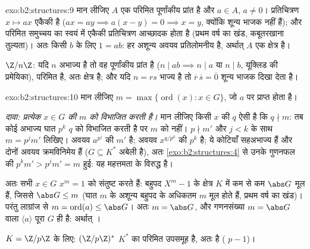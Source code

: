\begin{solution}{exo:b2:structures:9}
मान लीजिए $A$ एक परिमित पूर्णांकीय प्रांत है और $a \in A$, $a \neq 0$। प्रतिचित्रण
$x \mapsto ax$ एकैकी है ($ax = ay \implies a(x - y) = 0
\implies x = y$, क्योंकि शून्य भाजक नहीं हैं); और परिमित समुच्चय का
स्वयं में एकैकी प्रतिचित्रण आच्छादक होता है (प्रथम वर्ष का खंड,
कबूतरखाना तुल्यता)। अतः किसी $b$ के लिए $1 = ab$: हर अशून्य अवयव
प्रतिलोमनीय है, अर्थात् $A$ एक क्षेत्र है।

$\Z/n\Z$: यदि $n$ अभाज्य है तो वह पूर्णांकीय प्रांत है ($n \mid ab
\implies n \mid a$ या $n \mid b$,
यूक्लिड की प्रमेयिका), परिमित है, अतः क्षेत्र है; और यदि $n = rs$ भाज्य है
तो $\overline r\,\overline s =
\overline 0$ शून्य भाजक दिखा देता है।
\end{solution}

\begin{solution}{exo:b2:structures:10}
मान लीजिए $m = \max\{\operatorname{ord}(x) : x \in G\}$, जो $a$ पर प्राप्त होता है।

\emph{दावा: प्रत्येक $x \in G$ की  $m$ को विभाजित करती है।} मान लीजिए
किसी $x$ की  $q$ ऐसी है कि $q \nmid m$: तब कोई अभाज्य घात $p^k$ $q$ को
विभाजित करती है पर $m$ को नहीं। $p \nmid m'$ और $j
< k$ के साथ $m = p^j m'$ लिखिए। अवयव
$a^{p^j}$ की  $m'$ है; अवयव $x^{q/p^k}$ की  $p^k$ है; ये कोटियाँ सहअभाज्य
हैं और दोनों अवयव क्रमविनिमेय हैं ($G \subseteq K^*$ अबेली है), अतः \cref{exo:b2:structures:4} से उनके
गुणनफल की  $p^k m' > p^j m'
= m$ हुई: यह महत्तमता के विरुद्ध है।

अतः सभी $x \in G$ $x^m = 1$ को संतुष्ट करते हैं: बहुपद $X^m - 1$ के क्षेत्र $K$ में कम
से कम $\abs G$ मूल हैं, जिससे $\abs G \leq m$ (घात $m$ के अशून्य बहुपद के अधिकतम $m$
मूल होते हैं, प्रथम वर्ष का खंड)। परंतु लाग्रांज से $m = \operatorname{ord}(a) \leq \abs G$। अतः $m = \abs G$, और
गणनसंख्या $m =
\abs G$ वाला $\langle a \rangle$ पूरा $G$ ही है: अर्थात् ।

$K = \Z/p\Z$ के लिए: $(\Z/p\Z)^*$ $K^*$ का परिमित उपसमूह है, अतः  है ( $p - 1$)।
\end{solution}

